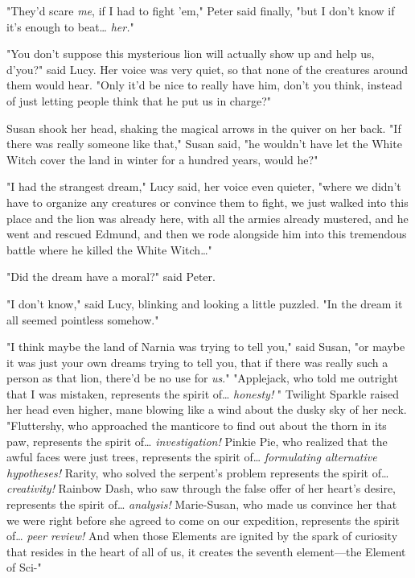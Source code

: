 "They'd scare \emph{me}, if I had to fight 'em," Peter said finally, "but I 
don't know if it's enough to beat{\ldots} \emph{her.}"

"You don't suppose this mysterious lion will actually show up and help us, 
d'you?" said Lucy. Her voice was very quiet, so that none of the creatures 
around them would hear. "Only it'd be nice to really have him, don't you think, 
instead of just letting people think that he put us in charge?"

Susan shook her head, shaking the magical arrows in the quiver on her back. "If 
there was really someone like that," Susan said, "he wouldn't have let the 
White Witch cover the land in winter for a hundred years, would he?"

"I had the strangest dream," Lucy said, her voice even quieter, "where we 
didn't have to organize any creatures or convince them to fight, we just walked 
into this place and the lion was already here, with all the armies already 
mustered, and he went and rescued Edmund, and then we rode alongside him into 
this tremendous battle where he killed the White Witch{\ldots}"

"Did the dream have a moral?" said Peter.

"I don't know," said Lucy, blinking and looking a little puzzled. "In the dream 
it all seemed pointless somehow."

"I think maybe the land of Narnia was trying to tell you," said Susan, "or 
maybe it was just your own dreams trying to tell you, that if there was really 
such a person as that lion, there'd be no use for \emph{us}."
\sbreak
"Applejack, who told me outright that I was mistaken, represents the spirit 
of{\ldots} \emph{honesty!} " Twilight Sparkle raised her head even higher, mane 
blowing like a wind about the dusky sky of her neck. "Fluttershy, who 
approached the manticore to find out about the thorn in its paw, represents the 
spirit of{\ldots} \emph{investigation!} Pinkie Pie, who realized that the awful 
faces were just trees, represents the spirit of{\ldots} \emph{formulating 
alternative hypotheses!} Rarity, who solved the serpent's problem represents 
the spirit of{\ldots} \emph{creativity!} Rainbow Dash, who saw through the 
false offer of her heart's desire, represents the spirit of{\ldots} 
\emph{analysis!} Marie-Susan, who made us convince her that we were right 
before she agreed to come on our expedition, represents the spirit of{\ldots} 
\emph{peer review!} And when those Elements are ignited by the spark of 
curiosity that resides in the heart of all of us, it creates the seventh 
element---the Element of Sci-"

